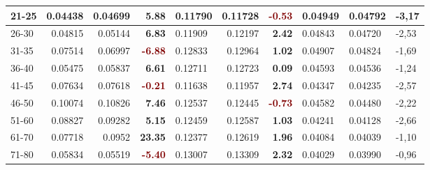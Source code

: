 \begin{table*}[h!]
\begin{tabular}{|l|r|r|r||l|r|r||l|l|l|}
        21-25   & 0.04438                                 & 0.04699                        & \textbf{\textcolor{OliveGreen}{5.88}}  & 0.11790 & 0.11728                  & \textbf{\textcolor{Maroon}{-0.53}}    & 0.04949 & 0.04792                & -3,17                  \\ \hline
        26-30   & 0.04815                                 & 0.05144                        & \textbf{\textcolor{OliveGreen}{6.83}}  & 0.11909 & 0.12197                  & \textbf{\textcolor{OliveGreen}{2.42}} & 0.04843 & 0.04720                & -2,53                  \\ \hline
        31-35   & 0.07514                                 & 0.06997                        & \textbf{\textcolor{Maroon}{-6.88}}     & 0.12833 & 0.12964                  & \textbf{\textcolor{OliveGreen}{1.02}} & 0.04907 & 0.04824                & -1,69                  \\ \hline
        36-40   & 0.05475                                 & 0.05837                        & \textbf{\textcolor{OliveGreen}{6.61}}  & 0.12711 & 0.12723                  & \textbf{\textcolor{OliveGreen}{0.09}} & 0.04593 & 0.04536                & -1,24                  \\ \hline
        41-45   & 0.07634                                 & 0.07618                        & \textbf{\textcolor{Maroon}{-0.21}}     & 0.11638 & 0.11957                  & \textbf{\textcolor{OliveGreen}{2.74}} & 0.04347 & 0.04235                & -2,57                  \\ \hline
        46-50   & 0.10074                                 & 0.10826                        & \textbf{\textcolor{OliveGreen}{7.46}}  & 0.12537 & 0.12445                  & \textbf{\textcolor{Maroon}{-0.73}}    & 0.04582 & 0.04480                & -2,22                  \\ \hline
        51-60   & 0.08827                                 & 0.09282                        & \textbf{\textcolor{OliveGreen}{5.15}}  & 0.12459 & 0.12587                  & \textbf{\textcolor{OliveGreen}{1.03}} & 0.04241 & 0.04128                & -2,66                  \\ \hline
        61-70   & 0.07718                                 & 0.0952                         & \textbf{\textcolor{OliveGreen}{23.35}} & 0.12377 & 0.12619                  & \textbf{\textcolor{OliveGreen}{1.96}} & 0.04084 & 0.04039                & -1,10                  \\ \hline
        71-80   & 0.05834                                 & 0.05519                        & \textbf{\textcolor{Maroon}{-5.40}}     & 0.13007 & 0.13309                  & \textbf{\textcolor{OliveGreen}{2.32}} & 0.04029 & 0.03990                & -0,96                  \\ \hline

\end{tabular}
\end{table*}

